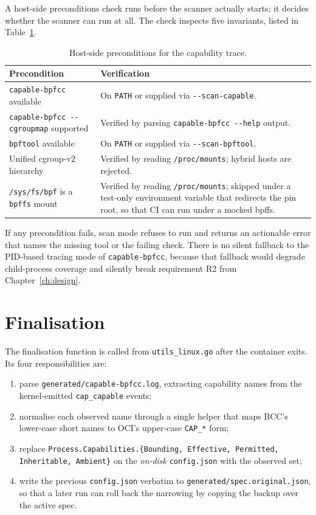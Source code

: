 A host-side preconditions check runs before the scanner actually starts; it decides whether the scanner can run at all. The check inspects five invariants, listed in Table~\ref{tab:preconditions}.

\begin{table}[ht]
\centering
\caption{Host-side preconditions for the capability trace.}
\label{tab:preconditions}
\begin{tabular}{p{5.0cm}p{9.2cm}}
\toprule
\textbf{Precondition} & \textbf{Verification} \\
\midrule
\texttt{capable-bpfcc} available & On \texttt{PATH} or supplied via \texttt{-{}-scan-capable}. \\
\texttt{capable-bpfcc -{}-cgroupmap} supported & Verified by parsing \texttt{capable-bpfcc -{}-help} output. \\
\texttt{bpftool} available & On \texttt{PATH} or supplied via \texttt{-{}-scan-bpftool}. \\
Unified cgroup-v2 hierarchy & Verified by reading \texttt{/proc/mounts}; hybrid hosts are rejected. \\
\texttt{/sys/fs/bpf} is a \texttt{bpffs} mount & Verified by reading \texttt{/proc/mounts}; skipped under a test-only environment variable that redirects the pin root, so that CI can run under a mocked bpffs. \\
\bottomrule
\end{tabular}
\end{table}

If any precondition fails, scan mode refuses to run and returns an actionable error that names the missing tool or the failing check. There is no silent fallback to the PID-based tracing mode of \texttt{capable-bpfcc}, because that fallback would degrade child-process coverage and silently break requirement R2 from Chapter~\ref{ch:design}.

\section{Finalisation}\label{sec:impl-final}

The finalisation function is called from \texttt{utils\_linux.go} after the container exits. Its four responsibilities are:

\begin{enumerate}
    \item parse \texttt{generated/capable-bpfcc.log}, extracting capability names from the kernel-emitted \texttt{cap\_capable} events;
    \item normalise each observed name through a single helper that maps BCC's lower-case short names to OCI's upper-case \texttt{CAP\_*} form;
    \item replace \texttt{Process.Capabilities.\{Bounding, Effective, Permitted, Inheritable, Ambient\}} on the \emph{on-disk} \texttt{config.json} with the observed set;
    \item write the previous \texttt{config.json} verbatim to \texttt{generated/spec.original.json}, so that a later run can roll back the narrowing by copying the backup over the active spec.
\end{enumerate}

